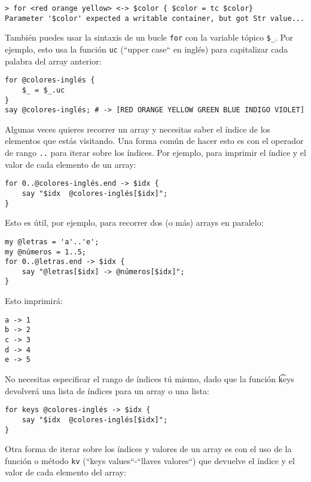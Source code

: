 \begin{lstlisting}
> for <red orange yellow> <-> $color { $color = tc $color}
Parameter '$color' expected a writable container, but got Str value...
\end{lstlisting}

También puedes usar la sintaxis de un bucle {\tt for}
con la variable tópico \verb|$_|. Por ejemplo, esto usa la 
función {\tt uc} (``upper case`` en inglés) para 
capitalizar cada palabra del array anterior:

\begin{lstlisting}
for @colores-inglés { 
    $_ = $_.uc 
}
say @colores-inglés; # -> [RED ORANGE YELLOW GREEN BLUE INDIGO VIOLET]
\end{lstlisting}
%

Algunas veces quieres recorrer un array y necesitas saber
el índice de los elementos que estás visitando. Una forma
común de hacer esto es con el operador de rango \verb|..|
para iterar sobre los índices. Por ejemplo, para imprimir 
el índice y el valor de cada elemento de un array:

\begin{lstlisting}
for 0..@colores-inglés.end -> $idx { 
    say "$idx  @colores-inglés[$idx]"; 
}
\end{lstlisting}

Esto es útil, por ejemplo, para recorrer dos (o más) arrays
en paralelo:

\begin{lstlisting}
my @letras = 'a'..'e';
my @números = 1..5;
for 0..@letras.end -> $idx { 
    say "@letras[$idx] -> @números[$idx]"; 
}
\end{lstlisting}
%

Esto imprimirá:
\begin{lstlisting}
a -> 1
b -> 2
c -> 3
d -> 4
e -> 5
\end{lstlisting}

No necesitas especificar el rango de índices tú mismo, dado que
la función {\t keys} devolverá una lista de índices para un
array o una lista:

\begin{lstlisting}
for keys @colores-inglés -> $idx { 
    say "$idx  @colores-inglés[$idx]"; 
}
\end{lstlisting}

Otra forma de iterar sobre los índices y valores de un
array es con el uso de la función o método 
{\tt kv} (``keys values``-``llaves valores``) que
devuelve el índice y el valor de cada elemento del array:

